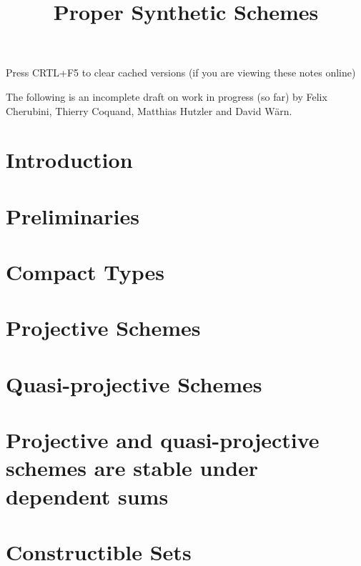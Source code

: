\documentclass{../util/zariski}
\title{Proper Synthetic Schemes}
\begin{document}
\maketitle

\begin{center}
  \color{purple}
  \large{Press CRTL+F5 to clear cached versions}
  \large{(if you are viewing these notes online)}
\end{center}

The following is an incomplete draft on work in progress (so far)
by Felix Cherubini, Thierry Coquand, Matthias Hutzler and David Wärn.

\tableofcontents


\section*{Introduction}


\section{Preliminaries}


\section{Compact Types}


\section{Projective Schemes}


\section{Quasi-projective Schemes}


\section{Projective and quasi-projective schemes are stable under dependent sums}


\section{Constructible Sets}


\printindex

\printbibliography
\end{document}
